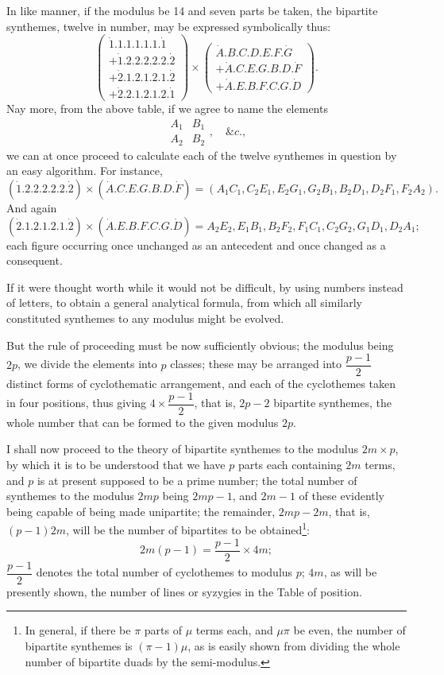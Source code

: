 \documentclass[11pt]{article}
\newcommand{\sourcepage}[1]{\marginpar{\scriptsize p.~#1}}
\newcommand{\dotter}[1]{\dot{#1}}
\begin{document}
In like manner, if the modulus be 14 and seven parts be taken, the bipartite synthemes, twelve in number, may be expressed symbolically thus:
\[
\left(\begin{array}{l}
\dotter1.1.1.1.1.1.\dotter1\\
+\dotter1.2.2.2.2.2.\dotter2\\
+\dotter2.1.2.1.2.1.\dotter2\\
+\dotter2.2.1.2.1.2.\dotter1
\end{array}\right)
\times
\left(\begin{array}{l}
\dotter A.B.C.D.E.F.\dotter G\\
+\dotter A.C.E.G.B.D.\dotter F\\
+\dotter A.E.B.F.C.G.\dotter D
\end{array}\right).
\]
Nay more, from the above table, if we agree to name the elements
\[
\begin{array}{cc}
A_1&B_1\\ A_2&B_2
\end{array},\quad \&c.,
\]
we can at once proceed to calculate each of the twelve synthemes in question by an easy algorithm. For instance,
\[
(\dotter1.2.2.2.2.2.\dotter2)\times(\dotter A.C.E.G.B.D.\dotter F)
=(A_1C_1,C_2E_1,E_2G_1,G_2B_1,B_2D_1,D_2F_1,F_2A_2).
\]
And again
\[
(\dotter2.1.2.1.2.1.\dotter2)\times(\dotter A.E.B.F.C.G.\dotter D)
= A_2E_2,E_1B_1,B_2F_2,F_1C_1,C_2G_2,G_1D_1,D_2A_1;
\]
each figure occurring once unchanged as an antecedent and once changed as a consequent.

If it were thought worth while it would not be difficult, by using numbers instead of letters, to obtain a general analytical formula, from which all similarly constituted synthemes to any modulus might be evolved.

But the rule of proceeding must be now sufficiently obvious; the modulus being $2p$, we divide the elements into $p$ classes; these may be arranged into $\dfrac{p-1}{2}$ distinct forms of cyclothematic arrangement, and each of the cyclothemes taken in four positions, thus giving $4\times\dfrac{p-1}{2}$, that is, $2p-2$ bipartite synthemes, the whole number that can be formed to the given modulus $2p$.

\sourcepage{97}
I shall now proceed to the theory of bipartite synthemes to the modulus $2m\times p$, by which it is to be understood that we have $p$ parts each containing $2m$ terms, and $p$ is at present supposed to be a prime number; the total number of synthemes to the modulus $2mp$ being $2mp-1$, and $2m-1$ of these evidently being capable of being made unipartite; the remainder, $2mp-2m$, that is, $(p-1)2m$, will be the number of bipartites to be obtained\footnote{In general, if there be $\pi$ parts of $\mu$ terms each, and $\mu\pi$ be even, the number of bipartite synthemes is $(\pi-1)\mu$, as is easily shown from dividing the whole number of bipartite duads by the semi-modulus.}:
\[
2m(p-1)=\frac{p-1}{2}\times 4m;
\]
$\dfrac{p-1}{2}$ denotes the total number of cyclothemes to modulus $p$; $4m$, as will be presently shown, the number of lines or syzygies in the Table of position.
\end{document}
